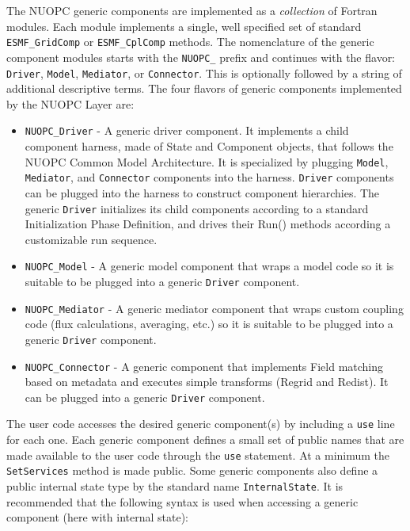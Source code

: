 
The NUOPC generic components are implemented as a {\em collection} of Fortran modules. Each module implements a single, well specified set of standard {\tt ESMF\_GridComp} or {\tt ESMF\_CplComp} methods. The nomenclature of the generic component modules starts with the {\tt NUOPC\_} prefix and continues with the flavor: {\tt Driver}, {\tt Model}, {\tt Mediator}, or {\tt Connector}. This is optionally followed by a string of additional descriptive terms. The four flavors of generic components implemented by the NUOPC Layer are:

\begin{itemize}

\item {\tt NUOPC\_Driver} - A generic driver component. It implements a child component harness, made of State and Component objects, that follows the NUOPC Common Model Architecture. It is specialized by plugging {\tt Model}, {\tt Mediator}, and {\tt Connector} components into the harness. {\tt Driver} components can be plugged into the harness to construct component hierarchies. The generic {\tt Driver} initializes its child components according to a standard Initialization Phase Definition, and drives their Run() methods according a customizable run sequence.

\item {\tt NUOPC\_Model} - A generic model component that wraps a model code so it is suitable to be plugged into a generic {\tt Driver} component.

\item {\tt NUOPC\_Mediator} - A generic mediator component that wraps custom coupling code (flux calculations, averaging, etc.) so it is suitable to be plugged into a generic {\tt Driver} component.

\item {\tt NUOPC\_Connector} - A generic component that implements Field matching based on metadata and executes simple transforms (Regrid and Redist). It can be plugged into a generic {\tt Driver} component.

\end{itemize}

The user code accesses the desired generic component(s) by including a {\tt use} line for each one. Each generic component defines a small set of public names that are made available to the user code through the {\tt use} statement. At a minimum the {\tt SetServices} method is made public. Some generic components also define a public internal state type by the standard name {\tt InternalState}. It is recommended that the following syntax is used when accessing a generic component (here with internal state):

